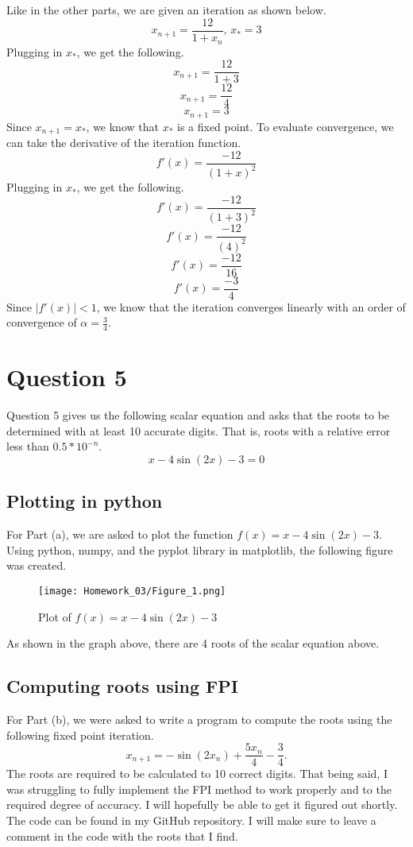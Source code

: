 \documentclass{article}
\theoremstyle{theorem}
\begin{document}
\subsection{}
Like in the other parts, we are given an iteration as shown below.
\[
x_{n+1} = \frac{12}{1+x_n} \mbox{, } x_* = 3
\]
Plugging in \(x_*\), we get the following.
\[
x_{n+1} = \frac{12}{1+3}
\]
\[
x_{n+1} = \frac{12}{4}
\]
\[
x_{n+1} = 3
\]
Since \(x_{n+1}=x_*\), we know that \(x_*\) is a fixed point. To evaluate convergence, we can take the derivative of the iteration function.
\[
f'(x)=\frac{-12}{(1+x)^2}
\]
Plugging in \(x_*\), we get the following.
\[
f'(x)=\frac{-12}{(1+3)^2}
\]
\[
f'(x)=\frac{-12}{(4)^2}
\]
\[
f'(x)=\frac{-12}{16}
\]
\[
f'(x)=\frac{-3}{4}
\]
Since \(|f'(x)|<1\), we know that the iteration converges linearly with an order of convergence of \(\alpha=\frac{3}{4}\).

\section{Question 5}
Question 5 gives us the following scalar equation and asks that the roots to be determined with at least 10 accurate digits. That is, roots with a relative error less than \(0.5*10^{-n}\).
\[
x-4\sin{(2x)}-3=0
\]

\subsection{Plotting in python}
For Part (a), we are asked to plot the function \(f(x)=x-4\sin{(2x)}-3\). Using python, numpy, and the pyplot library in matplotlib, the following figure was created.
\begin{figure}[h!]
    \centering
    \texttt{[image: Homework\_03/Figure\_1.png]}
    \caption{Plot of \(f(x)=x-4\sin{(2x)}-3\)}
    \label{fig:enter-label}
\end{figure}
As shown in the graph above, there are 4 roots of the scalar equation above.

\subsection{Computing roots using FPI}
For Part (b), we were asked to write a program to compute the roots using the following fixed point iteration.
\[
x_{n+1} = -\sin{(2x_n)}+\frac{5x_n}{4}-\frac{3}{4}.
\]
The roots are required to be calculated to 10 correct digits. That being said, I was struggling to fully implement the FPI method to work properly and to the required degree of accuracy. I will hopefully be able to get it figured out shortly. The code can be found in my GitHub repository. I will make sure to leave a comment in the code with the roots that I find.
\end{document}
